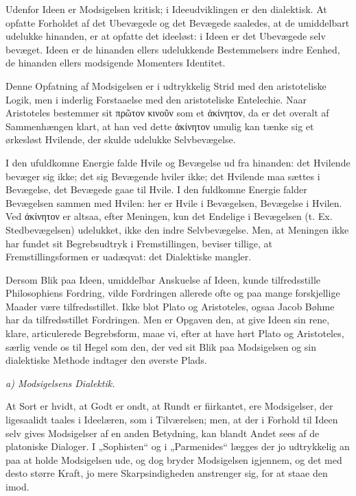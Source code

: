 \documentclass[12pt]{book}
\newcommand{\opage}[1]{\marginnote{\footnotesize\textit{[#1]}}}
\begin{document}
Udenfor Ideen er Modsigelsen kritisk; i Ideeudviklingen er den dialektisk. At opfatte Forholdet
af det Ubevægede og det Bevægede saaledes, at de umiddelbart udelukke hinanden, er at opfatte det
ideeløst: i Ideen er det Ubevægede selv bevæget. Ideen er de hinanden ellers udelukkende
Bestemmelsers indre Eenhed, de hinanden ellers modsigende Momenters Identitet.

\opage{149} Denne Opfatning af Modsigelsen er i udtrykkelig Strid med den aristoteliske Logik, men i inderlig
Forstaaelse med den aristoteliske Entelechie. Naar Aristoteles bestemmer sit πρῶτον κινοῦν som et
ἀκίνητον, da er det overalt af Sammenhængen klart, at han ved dette ἀκίνητον umulig kan tænke sig
et ørkesløst Hvilende, der skulde udelukke Selvbevægelse.

I den ufuldkomne Energie falde Hvile og Bevægelse ud fra hinanden: det Hvilende bevæger sig ikke;
det sig Bevægende hviler ikke; det Hvilende maa sættes i Bevægelse, det Bevægede gaae til Hvile.
I den fuldkomne Energie falder Bevægelsen sammen med Hvilen: her er Hvile i Bevægelsen, Bevægelse
i Hvilen. Ved ἀκίνητον er altsaa, efter Meningen, kun det Endelige i Bevægelsen (t. Ex.
Stedbevægelsen) udelukket, ikke den indre Selvbevægelse. Men, at Meningen ikke har fundet sit
Begrebsudtryk i Fremstillingen, beviser tillige, at Fremstillingsformen er uadæqvat: det
Dialektiske mangler.

Dersom Blik paa Ideen, umiddelbar Anskuelse af Ideen, kunde tilfredsstille Philosophiens Fordring,
vilde Fordringen allerede ofte og paa mange forskjellige Maader være tilfredsstillet. Ikke blot
Plato og Aristoteles, ogsaa Jacob Bøhme har da tilfredsstillet Fordringen. Men er Opgaven den, at
give Ideen sin rene, klare, articulerede Begrebsform, maae vi, efter at have hørt Plato og
Aristoteles, særlig vende os til Hegel som den, der ved sit Blik paa Modsigelsen og sin
dialektiske Methode indtager den øverste Plads.

\emph{a) Modsigelsens Dialektik.}

At Sort er hvidt, at Godt er ondt, at Rundt er fiirkantet, ere Modsigelser, der ligesaalidt taales
i Ideelæren, som i Tilværelsen; men, at der i Forhold til Ideen selv gives Modsigelser af en
anden Betydning, kan blandt Andet sees af de platoniske Dialoger. I „Sophisten“ og i „Parmenides“
\opage{150} lægges der jo udtrykkelig an paa at holde Modsigelsen ude, og dog bryder Modsigelsen igjennem, og
det med desto større Kraft, jo mere Skarpsindigheden anstrenger sig, for at staae den imod.
\end{document}
